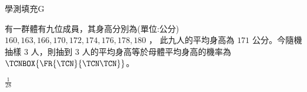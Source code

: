     \begin{QUESTION}
        \begin{ExamInfo}{91}{學測}{填充}{G}
        \end{ExamInfo}
        \begin{ExamAnsRateInfo}{29}{58}{24}{5}
        \end{ExamAnsRateInfo}
        \begin{QBODY}
            有一群體有九位成員，其身高分別為(單位:公分) $160, 163, 166, 170, 172, 174, 176, 178, 180$ ， 此九人的平均身高為 $171$ 公分。今隨機抽樣 $3$ 人，則抽到 $3$ 人的平均身高等於母體平均身高的機率為 
            $\TCNBOX{\FR{\TCN}{\TCN\TCN}} $。
        \end{QBODY}
        \begin{QFROMS}
        \end{QFROMS}
        \begin{QTAGS}\end{QTAGS}
        \begin{QANS}
            $\frac{1}{28}$
        \end{QANS}
        \begin{QSOLLIST}
        \end{QSOLLIST}
        \begin{QEMPTYSPACE}
        \end{QEMPTYSPACE}
    \end{QUESTION}
